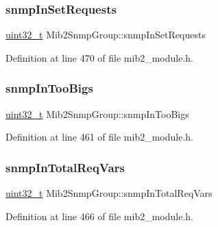 \mbox{\label{structMib2SnmpGroup_ab2b8d450820864c62a9bcbf3827cb22a}} 
\subsubsection{\texorpdfstring{snmp\+In\+Set\+Requests}{snmpInSetRequests}}
{\footnotesize\ttfamily \hyperlink{stdint_8h_a435d1572bf3f880d55459d9805097f62}{uint32\+\_\+t} Mib2\+Snmp\+Group\+::snmp\+In\+Set\+Requests}



Definition at line 470 of file mib2\+\_\+module.\+h.

\mbox{\label{structMib2SnmpGroup_a7018f96f34d114954983cb041283957c}} 
\subsubsection{\texorpdfstring{snmp\+In\+Too\+Bigs}{snmpInTooBigs}}
{\footnotesize\ttfamily \hyperlink{stdint_8h_a435d1572bf3f880d55459d9805097f62}{uint32\+\_\+t} Mib2\+Snmp\+Group\+::snmp\+In\+Too\+Bigs}



Definition at line 461 of file mib2\+\_\+module.\+h.

\mbox{\label{structMib2SnmpGroup_a4631fc87dbfb076a02e3732919ed4acd}} 
\subsubsection{\texorpdfstring{snmp\+In\+Total\+Req\+Vars}{snmpInTotalReqVars}}
{\footnotesize\ttfamily \hyperlink{stdint_8h_a435d1572bf3f880d55459d9805097f62}{uint32\+\_\+t} Mib2\+Snmp\+Group\+::snmp\+In\+Total\+Req\+Vars}



Definition at line 466 of file mib2\+\_\+module.\+h.

